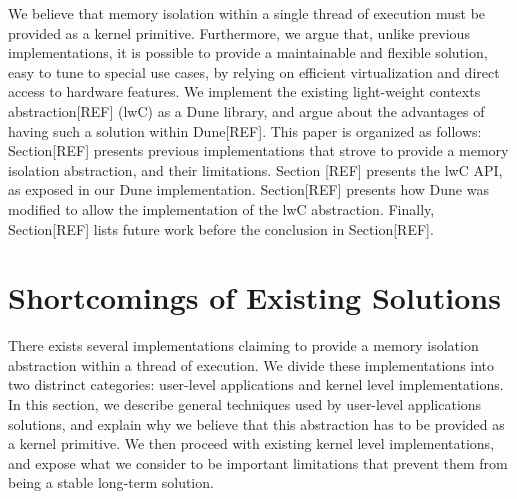 \documentclass[letterpaper,twocolumn,10pt]{article}
\begin{document}
We believe that memory isolation within a single thread of execution must be provided as a kernel primitive.
Furthermore, we argue that, unlike previous implementations, it is possible to provide a maintainable and flexible solution, easy to tune to special use cases, by relying on efficient virtualization and direct access to hardware features.
We implement the existing light-weight contexts abstraction[REF] (lwC) as a Dune library, and argue about the advantages of having such a solution within Dune[REF].
This paper is organized as follows: Section[REF] presents previous implementations that strove to provide a memory isolation abstraction, and their limitations.
Section [REF] presents the lwC API, as exposed in our Dune implementation.
Section[REF] presents how Dune was modified to allow the implementation of the lwC abstraction.
Finally, Section[REF] lists future work before the conclusion in Section[REF].


%

\section{Shortcomings of Existing Solutions}
There exists several implementations claiming to provide a memory isolation abstraction within a thread of execution.
We divide these implementations into two distrinct categories: user-level applications and kernel level implementations.
In this section, we describe general techniques used by user-level applications solutions, and explain why we believe that this abstraction has to be provided as a kernel primitive.
We then proceed with existing kernel level implementations, and expose what we consider to be important limitations that prevent them from being a stable long-term solution.\\
\end{document}

